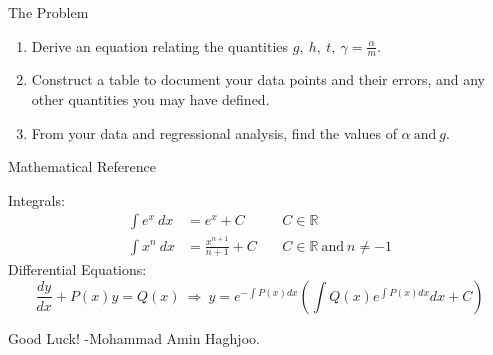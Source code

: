 \documentclass{article}
\begin{document}
\begin{center}
    \huge The Problem
\end{center}

\vspace{0.4 cm}

\begin{enumerate}[label = \alph*)]
    \item Derive an equation relating the quantities $g,\ h,\ t, \ \gamma = \frac{\alpha}{m}$.
    \item Construct a table to document your data points and their errors, and any other quantities you may have defined.
    \item From your data and regressional analysis, find the values of $\alpha \ \text{and} \ g$.
\end{enumerate}

\begin{center}
    \huge Mathematical Reference
\end{center}
\vspace{0.5 cm}
Integrals:
\begin{align}
    \int e^x \ dx &=e^x+C& \ &C \in \mathbb{R} \\
    \int x^n \ dx &=\frac{x^{n+1}}{n+1}+C& \ &C \in \mathbb{R} \ \text{and} \ n\neq -1
\end{align}
Differential Equations:
\begin{equation}
    \frac{dy}{dx}+P(x)y=Q(x) \ \Rightarrow \ y=e^{-\int P(x)dx} \left ( \int Q(x)e^{\int P(x)dx}dx+C \right )
\end{equation}

Good Luck! \vspace{5 mm} -Mohammad Amin Haghjoo.
\end{document}
